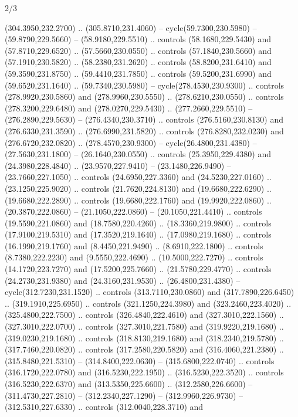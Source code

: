 \begin{flagdescription}{2/3}
\begin{scope}[xshift=0.5\flaglength,yshift=0.5\flagwidth,scale=\stretchfactor]
\begin{scope}[scale=0.001645\flagwidth,yshift=65mm,xshift=-63mm]
\begin{scope}[y=0.80pt, x=0.80pt, yscale=-1,]
\begin{scope}[cm={{1.33333,0.0,0.0,1.33333,(0.0,1e-05)}}]
  (304.3950,232.2700) .. (305.8710,231.4060) -- cycle(59.7300,230.5980) --
  (59.8790,229.5660) -- (58.9180,229.5510) .. controls (58.1680,229.5430) and
  (57.8710,229.6520) .. (57.5660,230.0550) .. controls (57.1840,230.5660) and
  (57.1910,230.5820) .. (58.2380,231.2620) .. controls (58.8200,231.6410) and
  (59.3590,231.8750) .. (59.4410,231.7850) .. controls (59.5200,231.6990) and
  (59.6520,231.1640) .. (59.7340,230.5980) -- cycle(278.4530,230.9300) ..
  controls (278.9920,230.5860) and (278.9960,230.5550) .. (278.6210,230.0550) ..
  controls (278.3200,229.6480) and (278.0270,229.5430) .. (277.2660,229.5510) --
  (276.2890,229.5630) -- (276.4340,230.3710) .. controls (276.5160,230.8130) and
  (276.6330,231.3590) .. (276.6990,231.5820) .. controls (276.8280,232.0230) and
  (276.6720,232.0820) .. (278.4570,230.9300) -- cycle(26.4800,231.4380) --
  (27.5630,231.1800) -- (26.1640,230.0550) .. controls (25.3950,229.4380) and
  (24.3980,228.4840) .. (23.9570,227.9410) -- (23.1480,226.9490) --
  (23.7660,227.1050) .. controls (24.6950,227.3360) and (24.5230,227.0160) ..
  (23.1250,225.9020) .. controls (21.7620,224.8130) and (19.6680,222.6290) ..
  (19.6680,222.2890) .. controls (19.6680,222.1760) and (19.9920,222.0860) ..
  (20.3870,222.0860) -- (21.1050,222.0860) -- (20.1050,221.4410) .. controls
  (19.5590,221.0860) and (18.7580,220.4260) .. (18.3360,219.9800) .. controls
  (17.9100,219.5310) and (17.3520,219.1640) .. (17.0980,219.1680) .. controls
  (16.1990,219.1760) and (8.4450,221.9490) .. (8.6910,222.1800) .. controls
  (8.7380,222.2230) and (9.5550,222.4690) .. (10.5000,222.7270) .. controls
  (14.1720,223.7270) and (17.5200,225.7660) .. (21.5780,229.4770) .. controls
  (24.2730,231.9380) and (24.3160,231.9530) .. (26.4800,231.4380) --
  cycle(312.7230,231.1520) .. controls (313.7110,230.0860) and
  (317.7890,226.6450) .. (319.1910,225.6950) .. controls (321.1250,224.3980) and
  (323.2460,223.4020) .. (325.4800,222.7500) .. controls (326.4840,222.4610) and
  (327.3010,222.1560) .. (327.3010,222.0700) .. controls (327.3010,221.7580) and
  (319.9220,219.1680) .. (319.0230,219.1680) .. controls (318.8130,219.1680) and
  (318.2340,219.5780) .. (317.7460,220.0820) .. controls (317.2580,220.5820) and
  (316.4060,221.2380) .. (315.8480,221.5310) -- (314.8400,222.0630) --
  (315.6800,222.0740) .. controls (316.1720,222.0780) and (316.5230,222.1950) ..
  (316.5230,222.3520) .. controls (316.5230,222.6370) and (313.5350,225.6600) ..
  (312.2580,226.6600) -- (311.4730,227.2810) -- (312.2340,227.1290) --
  (312.9960,226.9730) -- (312.5310,227.6330) .. controls (312.0040,228.3710) and

\end{scope}
\end{scope}
\end{scope}
\end{scope}
\end{flagdescription}
